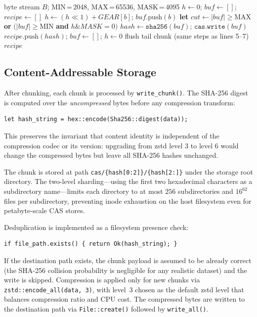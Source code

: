 \documentclass[journal]{IEEEtran}
\begin{document}
\begin{algorithm}
\caption{CDC Boundary Detection (\texttt{create\_recipe\_from\_data()})}
\label{alg:cdc}
\small
\begin{algorithmic}[1]
\REQUIRE byte stream $B$; MIN\,=\,2048, MAX\,=\,65536, MASK\,=\,4095
\STATE $h \leftarrow 0$;\; $\mathit{buf} \leftarrow []$;\;
       $\mathit{recipe} \leftarrow []$
  \STATE $h \leftarrow (h \ll 1) + \mathit{GEAR}[b]$;\;
         $\mathit{buf}.\text{push}(b)$
  \STATE \textbf{let} $\mathit{cut} \leftarrow
         |\mathit{buf}| \geq \text{MAX}$ \textbf{or}
         $(|\mathit{buf}| \geq \text{MIN}$ \textbf{and}
         $h \mathbin{\&} \mathit{MASK} = 0)$
    \STATE $\mathit{hash} \leftarrow \texttt{sha256}(\mathit{buf})$;\;
           $\texttt{cas.write}(\mathit{buf})$
    \STATE $\mathit{recipe}.\text{push}(\mathit{hash})$;\;
           $\mathit{buf} \leftarrow []$;\; $h \leftarrow 0$
  \ENDIF
\ENDFOR
{}
  \STATE flush tail chunk (same steps as lines 5--7)
\ENDIF
\RETURN $\mathit{recipe}$
\end{algorithmic}
\end{algorithm}

\subsection{Content-Addressable Storage}
\label{sec:cas}

After chunking, each chunk is processed by \texttt{write\_chunk()}.
The SHA-256 digest is computed over the \emph{uncompressed} bytes before
any compression transform:
\begin{lstlisting}
let hash_string = hex::encode(Sha256::digest(data));
\end{lstlisting}
This preserves the invariant that content identity is independent of the
compression codec or its version: upgrading from zstd level 3 to level
6 would change the compressed bytes but leave all SHA-256 hashes
unchanged.

The chunk is stored at path
\texttt{cas/\{hash[0:2]\}/\{hash[2:]\}} under the storage root directory.
The two-level sharding---using the first two hexadecimal characters as a
subdirectory name---limits each directory to at most $256$ subdirectories
and $16^{62}$ files per subdirectory, preventing inode exhaustion on
the host filesystem even for petabyte-scale CAS stores.

Deduplication is implemented as a filesystem presence check:
\begin{lstlisting}
if file_path.exists() { return Ok(hash_string); }
\end{lstlisting}
If the destination path exists, the chunk payload is assumed to be
already correct (the SHA-256 collision probability is negligible for
any realistic dataset) and the write is skipped.  Compression is applied
only for new chunks via \texttt{zstd::encode\_all(data, 3)}, with
level~3 chosen as the default zstd level that balances compression ratio
and CPU cost.  The compressed bytes are written to the destination path
via \texttt{File::create()} followed by \texttt{write\_all()}.
\end{document}
